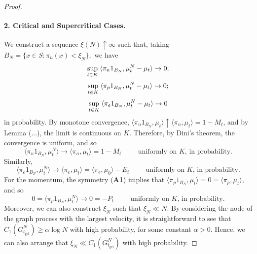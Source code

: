 \begin{proof}
\paragraph{2. Critical and Supercritical Cases.} We construct a sequence $\xi(N)\uparrow \infty$ such that, taking $
    B_N=\{x \in S: \pi_n(x)<\xi_N\},$ we have  \begin{equation}
   \sup_{t\in K}\hspace{0.1cm} \langle \pi_n 1_{B_N}, \mu^N_t-\mu_t\rangle \rightarrow 0;
\end{equation} \begin{equation}
   \sup_{t\in K}\hspace{0.1cm} \langle \pi_p 1_{B_N}, \mu^N_t-\mu_t\rangle \rightarrow 0;
\end{equation}\begin{equation}
   \sup_{t\in K}\hspace{0.1cm} \langle \pi_e 1_{B_N}, \mu^N_t-\mu_t\rangle \rightarrow 0
\end{equation} in probability. By monotone convergence, $\langle \pi_n1_{B_N},\mu_t\rangle \uparrow \langle \pi_n, \mu_t\rangle=1-M_t$, and by Lemma (...), the limit is continuous on $K$. Therefore, by Dini's theorem, the convergence is uniform, and so  \begin{equation} \langle \pi_n1_{B_N}, \mu^N_t\rangle \rightarrow \langle \pi_n, \mu_t\rangle =1-M_t \hspace{1cm}\text{uniformly on $K$, in probability.} \end{equation} Similarly, \begin{equation} \langle \pi_e1_{B_N}, \mu_t^N\rangle \rightarrow \langle \pi_e, \mu_t\rangle =\langle \pi_e, \mu_0\rangle -E_t \hspace{1cm}\text{uniformly on $K$, in probability.} \end{equation} For the momentum, the symmetry (\textbf{A1}) implies that $\langle \pi_p 1_{B_N}, \mu_t\rangle =0=\langle \pi_p, \mu_t\rangle$, and so \begin{equation} 0=\langle \pi_p1_{B_N}, \mu^N_t\rangle \rightarrow 0=-P_t \hspace{1cm}\text{uniformly on $K$, in probability.} \end{equation} Moreover, we can also construct $\xi_N$ such that $\xi_N \ll N$. By considering the node of the graph process with the largest velocity, it is straightforward to see that $C_1(G^N_{t_\text{gel}})\geq \alpha \log N$ with high probability, for some constant $\alpha>0$. Hence, we can also arrange that $\xi_N \ll C_1(G^N_{t_\text{gel}})$ with high probability. 

\end{proof}
